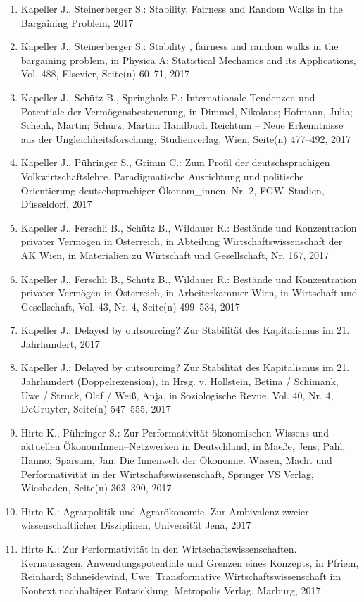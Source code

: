 \begin{enumerate}
	 \item Kapeller J., Steinerberger S.: Stability, Fairness and Random Walks in the Bargaining Problem, 2017
	 \item Kapeller J., Steinerberger S.: Stability , fairness and random walks in the bargaining problem, in Physica A: Statistical Mechanics and its Applications, Vol. 488, Elsevier, Seite(n) 60--71, 2017
	 \item Kapeller J., Schütz B., Springholz F.: Internationale Tendenzen und Potentiale der Vermögensbesteuerung, in Dimmel, Nikolaus; Hofmann, Julia; Schenk, Martin; Schürz, Martin: Handbuch Reichtum – Neue Erkenntnisse aus der Ungleichheitsforschung, Studienverlag, Wien, Seite(n) 477--492, 2017
	 \item Kapeller J., Pühringer S., Grimm C.: Zum Profil der deutschsprachigen Volkwirtschaftslehre. Paradigmatische Ausrichtung und politische Orientierung deutschsprachiger Ökonom\_innen, Nr. 2, FGW--Studien, Düsseldorf, 2017
	 \item Kapeller J., Ferschli B., Schütz B., Wildauer R.: Bestände und Konzentration privater Vermögen in Österreich, in Abteilung Wirtschaftswissenschaft der AK Wien, in Materialien zu Wirtschaft und Gesellschaft, Nr. 167, 2017
	 \item Kapeller J., Ferschli B., Schütz B., Wildauer R.: Bestände und Konzentration privater Vermögen in Österreich, in Arbeiterkammer Wien, in Wirtschaft und Gesellschaft, Vol. 43, Nr. 4, Seite(n) 499--534, 2017
	 \item Kapeller J.: Delayed by outsourcing? Zur Stabilität des Kapitalismus im 21. Jahrhundert, 2017
	 \item Kapeller J.: Delayed by outsourcing? Zur Stabilität des Kapitalismus im 21. Jahrhundert (Doppelrezension), in Hrsg. v. Hollstein, Betina / Schimank, Uwe / Struck, Olaf / Weiß, Anja, in Soziologische Revue, Vol. 40, Nr. 4, DeGruyter, Seite(n) 547–555, 2017
	 \item Hirte K., Pühringer S.: Zur Performativität ökonomischen Wissens und aktuellen ÖkonomInnen--Netzwerken in Deutschland, in Maeße, Jens; Pahl, Hanno; Sparsam, Jan: Die Innenwelt der Ökonomie. Wissen, Macht und Performativität in der Wirtschaftswissenschaft, Springer VS Verlag, Wiesbaden, Seite(n) 363--390, 2017
	 \item Hirte K.: Agrarpolitik und Agrarökonomie. Zur Ambivalenz zweier wissenschaftlicher Disziplinen, Universität Jena, 2017
	 \item Hirte K.: Zur Performativität in den Wirtschaftswissenschaften. Kernaussagen, Anwendungspotentiale und Grenzen eines Konzepts, in Pfriem, Reinhard; Schneidewind, Uwe: Transformative Wirtschaftswissenschaft im Kontext nachhaltiger Entwicklung, Metropolis Verlag, Marburg, 2017

\end{enumerate}
